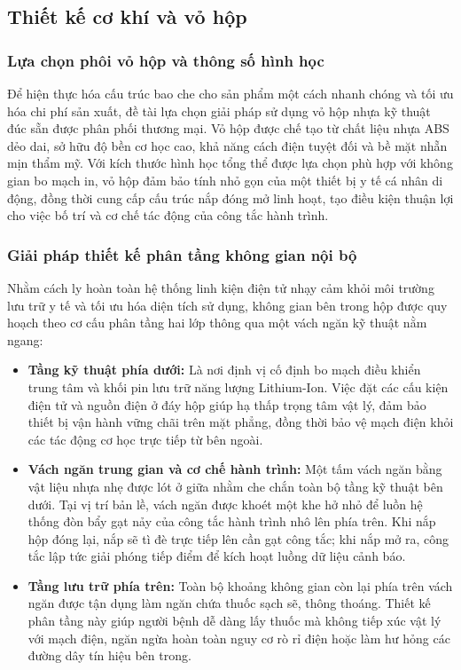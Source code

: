 \documentclass[12pt, a4paper, oneside]{article}
\begin{document}
\subsection{Thiết kế cơ khí và vỏ hộp}
\subsubsection{Lựa chọn phôi vỏ hộp và thông số hình học}
Để hiện thực hóa cấu trúc bao che cho sản phẩm một cách nhanh chóng và tối ưu hóa chi phí sản xuất, đề tài lựa chọn giải pháp sử dụng vỏ hộp nhựa kỹ thuật đúc sẵn được phân phối thương mại. Vỏ hộp được chế tạo từ chất liệu nhựa ABS dẻo dai, sở hữu độ bền cơ học cao, khả năng cách điện tuyệt đối và bề mặt nhẵn mịn thẩm mỹ. Với kích thước hình học tổng thể được lựa chọn phù hợp với không gian bo mạch in, vỏ hộp đảm bảo tính nhỏ gọn của một thiết bị y tế cá nhân di động, đồng thời cung cấp cấu trúc nắp đóng mở linh hoạt, tạo điều kiện thuận lợi cho việc bố trí và cơ chế tác động của công tắc hành trình.

\subsubsection{Giải pháp thiết kế phân tầng không gian nội bộ}
Nhằm cách ly hoàn toàn hệ thống linh kiện điện tử nhạy cảm khỏi môi trường lưu trữ y tế và tối ưu hóa diện tích sử dụng, không gian bên trong hộp được quy hoạch theo cơ cấu phân tầng hai lớp thông qua một vách ngăn kỹ thuật nằm ngang:
\begin{itemize}
    \item \textbf{Tầng kỹ thuật phía dưới:} Là nơi định vị cố định bo mạch điều khiển trung tâm và khối pin lưu trữ năng lượng Lithium-Ion. Việc đặt các cấu kiện điện tử và nguồn điện ở đáy hộp giúp hạ thấp trọng tâm vật lý, đảm bảo thiết bị vận hành vững chãi trên mặt phẳng, đồng thời bảo vệ mạch điện khỏi các tác động cơ học trực tiếp từ bên ngoài.
    \item \textbf{Vách ngăn trung gian và cơ chế hành trình:} Một tấm vách ngăn bằng vật liệu nhựa nhẹ được lót ở giữa nhằm che chắn toàn bộ tầng kỹ thuật bên dưới. Tại vị trí bản lề, vách ngăn được khoét một khe hở nhỏ để luồn hệ thống đòn bẩy gạt nảy của công tắc hành trình nhô lên phía trên. Khi nắp hộp đóng lại, nắp sẽ tì đè trực tiếp lên cần gạt công tắc; khi nắp mở ra, công tắc lập tức giải phóng tiếp điểm để kích hoạt luồng dữ liệu cảnh báo.
    \item \textbf{Tầng lưu trữ phía trên:} Toàn bộ khoảng không gian còn lại phía trên vách ngăn được tận dụng làm ngăn chứa thuốc sạch sẽ, thông thoáng. Thiết kế phân tầng này giúp người bệnh dễ dàng lấy thuốc mà không tiếp xúc vật lý với mạch điện, ngăn ngừa hoàn toàn nguy cơ rò rỉ điện hoặc làm hư hỏng các đường dây tín hiệu bên trong.
\end{itemize}
\end{document}
